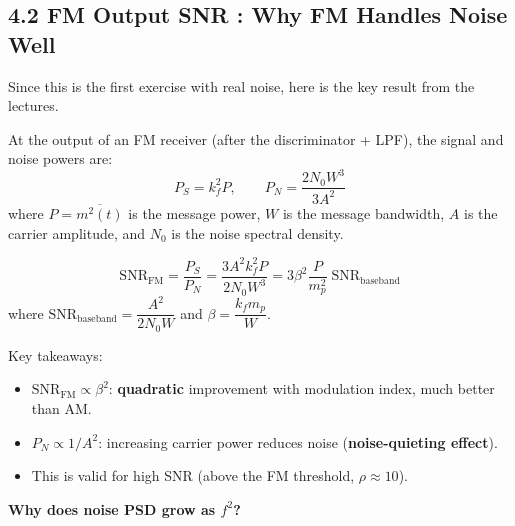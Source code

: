 \documentclass[../../main.tex]{subfiles}
\begin{document}
\subsection{4.2 \; FM Output SNR : Why FM Handles Noise Well}

Since this is the first exercise with real noise, here is the key result from the lectures.

At the output of an FM receiver (after the discriminator + LPF), the signal and noise powers are:
\[
  P_S = k_f^2 P, \qquad P_N = \frac{2N_0 W^3}{3A^2}
\]
where $P = \overline{m^2(t)}$ is the message power, $W$ is the message bandwidth, $A$ is the carrier amplitude, and $N_0$ is the noise spectral density.

\begin{KeyBox}
\[
  \text{SNR}_\text{FM} = \frac{P_S}{P_N} = \frac{3A^2 k_f^2 P}{2N_0 W^3}
  = 3\beta^2 \frac{P}{m_p^2}\;\text{SNR}_\text{baseband}
\]
where $\text{SNR}_\text{baseband} = \dfrac{A^2}{2N_0 W}$ and $\beta = \dfrac{k_f m_p}{W}$.

Key takeaways:
\begin{itemize}[leftmargin=1.5em]
  \item $\text{SNR}_\text{FM} \propto \beta^2$: \textbf{quadratic} improvement with modulation index, much better than AM.
  \item $P_N \propto 1/A^2$: increasing carrier power reduces noise (\textbf{noise-quieting effect}).
  \item This is valid for high SNR (above the FM threshold, $\rho \approx 10$).
\end{itemize}
\end{KeyBox}

\vspace{0.5em}

\textbf{Why does noise PSD grow as $f^2$?}
\end{document}
